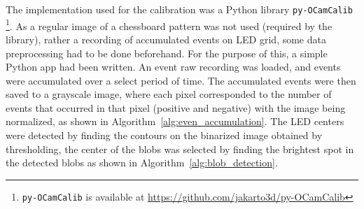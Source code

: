 The implementation used for the calibration was a Python library \texttt{py-OCamCalib} \footnote{\texttt{py-OCamCalib} is available at \url{https://github.com/jakarto3d/py-OCamCalib}}.
As a regular image of a chessboard pattern was not used (required by the library), rather a recording of accumulated events on \ac{LED} grid, some data preprocessing had to be done beforehand.
For the purpose of this, a simple Python app had been written. An event raw recording was loaded, and events were accumulated over a select period of time.
The accumulated events were then saved to a grayscale image, where each pixel corresponded to the number of events that occurred in that
pixel (positive and negative) with the image being normalized, as shown in Algorithm~\ref{alg:even_accumulation}.
The LED centers were detected by finding the contours on the binarized image obtained by thresholding, the center of the blobs was selected by finding the
brightest spot in the detected blobs as shown in Algorithm~\ref{alg:blob_detection}.

